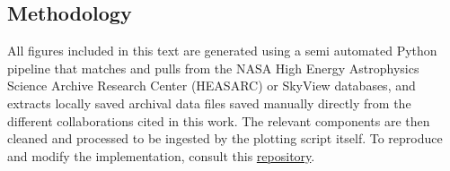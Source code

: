 \subsection{Methodology}

All figures included in this text are generated using a semi automated Python pipeline that
matches and pulls from the NASA High Energy Astrophysics Science Archive Research Center
(HEASARC) or SkyView databases, and extracts locally saved archival data files saved manually
directly from the different collaborations cited in this work. The relevant components
are then cleaned and processed to be ingested by the plotting script itself. To reproduce and modify the
implementation, consult this \href{https://github.com/fritzali/notes/tree/main/MASS/Spectroscopy}{repository}.
